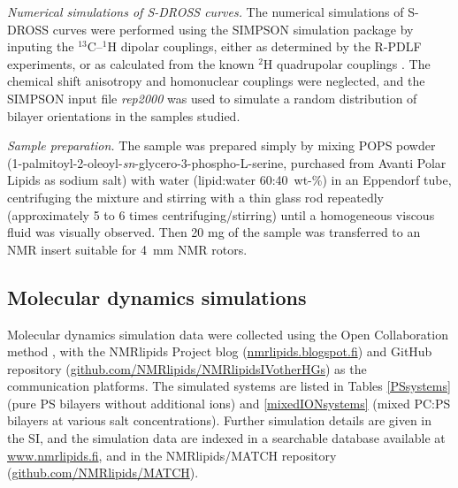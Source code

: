 \documentclass[journal=jpcbfk,manuscript=article]{achemso}
\begin{document}
\emph{Numerical simulations of S-DROSS curves.}
The numerical simulations of S-DROSS curves were performed using the SIMPSON simulation package \cite{bak00}
by inputing the $^{13}$C--$^1$H
dipolar couplings, either as determined by the R-PDLF experiments, or as calculated from the known $^2$H quadrupolar couplings \cite{browning80}.
The chemical shift anisotropy and homonuclear couplings were neglected, and the SIMPSON input file {\it{rep2000}} was used to simulate a random
distribution of bilayer orientations in the samples studied.

\emph{Sample preparation.}
The sample was prepared simply by mixing POPS powder (1-palmitoyl-2-oleoyl-{\it sn}-glycero-3-phospho-L-serine, purchased from Avanti Polar Lipids
as sodium salt) with water (lipid:water 60:40~wt-\%) in an Eppendorf tube, centrifuging the mixture and stirring with a thin glass rod repeatedly (approximately 5 to 6 times centrifuging/stirring) until a homogeneous viscous fluid was visually observed. Then 20 mg of the sample was transferred to an NMR insert suitable for 4~mm NMR rotors.  


\subsection{Molecular dynamics simulations}
Molecular dynamics simulation data were collected using
the Open Collaboration method \cite{botan15}, with
the NMR\-lipids Project blog (\url{nmrlipids.blogspot.fi}) and
GitHub repository (\url{github.com/NMRlipids/NMRlipidsIVotherHGs})
as the communication platforms.
The simulated systems are listed in 
Tables \ref{PSsystems} (pure PS bilayers without additional ions) 
and \ref{mixedIONsystems} (mixed PC:PS bilayers at various salt concentrations).
Further simulation details are given in the SI, and
the simulation data are indexed in a
searchable database available at \url{www.nmrlipids.fi},
and in the NMRlipids/MATCH repository (\url{github.com/NMRlipids/MATCH}).
\end{document}
